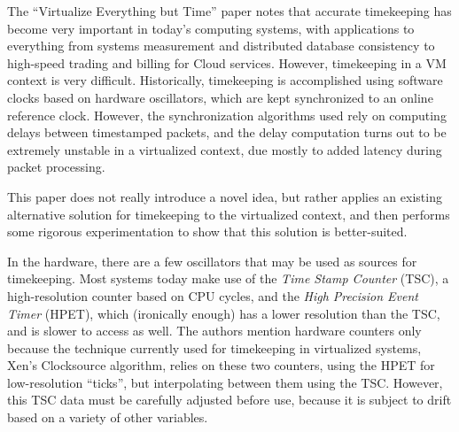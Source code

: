 \documentclass[letterpaper, twocolumn]{article}
\begin{document}
The ``Virtualize Everything but Time'' paper \cite{ref:time} notes that accurate
timekeeping has become very important in today's computing systems, with
applications to everything from systems measurement and distributed database
consistency to high-speed trading and billing for Cloud services.  However, 
timekeeping in a VM context is very difficult.  Historically, timekeeping
is accomplished using software clocks based on hardware oscillators, which
are kept synchronized to an online
reference clock.  However, the synchronization algorithms used rely on
computing delays between timestamped packets, and the delay computation
turns out to be extremely unstable in a virtualized context, due mostly
to added latency during packet processing.

This paper does not really introduce a novel idea, but rather applies
an existing alternative solution for timekeeping to the virtualized context,
and then performs some rigorous experimentation to show that this solution
is better-suited.

In the hardware, there are a few oscillators that may be used as sources
for timekeeping.  Most systems today make use of the \emph{Time Stamp Counter}
(TSC), a high-resolution counter based on CPU cycles, and the
\emph{High Precision Event Timer} (HPET), which (ironically enough) has a
lower resolution than the TSC, and is slower to access as well.  The authors
mention hardware counters only because the technique currently used for timekeeping
in virtualized systems, Xen's Clocksource algorithm, relies on these two counters,
using the HPET for low-resolution ``ticks'', but interpolating between them using
the TSC.  However, this TSC data must be carefully adjusted before use, because
it is subject to drift based on a variety of other variables.
\end{document}
